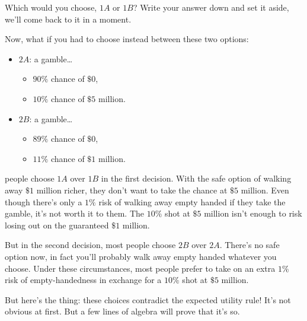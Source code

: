 \documentclass[justified]{tufte-book}
\providecommand{\tightlist}{%
  \setlength{\itemsep}{0pt}\setlength{\parskip}{0pt}}
\theoremstyle{definition}
\theoremstyle{definition}
\theoremstyle{definition}
\theoremstyle{remark}
\begin{document}
Which would you choose, \(1A\) or \(1B\)? Write your answer down and set
it aside, we'll come back to it in a moment.

Now, what if you had to choose instead between these two options:

\begin{itemize}
\tightlist
\item
  \(2A\): a gamble\ldots{}

  \begin{itemize}
  \tightlist
  \item
    \(90\%\) chance of \(\$0\),
  \item
    \(10\%\) chance of \(\$5\) million.
  \end{itemize}
\item
  \(2B\): a gamble\ldots{}

  \begin{itemize}
  \tightlist
  \item
    \(89\%\) chance of \(\$0\),
  \item
    \(11\%\) chance of \(\$1\) million.
  \end{itemize}
\end{itemize}

 people choose \(1A\) over \(1B\) in the first
decision. With the safe option of walking away \(\$1\) million richer,
they don't want to take the chance at \(\$5\) million. Even though
there's only a \(1\%\) risk of walking away empty handed if they take
the gamble, it's not worth it to them. The \(10\%\) shot at \(\$5\)
million isn't enough to risk losing out on the guaranteed \(\$1\)
million.

But in the second decision, most people choose \(2B\) over \(2A\).
There's no safe option now, in fact you'll probably walk away empty
handed whatever you choose. Under these circumstances, most people
prefer to take on an extra \(1\%\) risk of empty-handedness in exchange
for a \(10\%\) shot at \(\$5\) million.

But here's the thing: these choices contradict the expected utility
rule! It's not obvious at first. But a few lines of algebra will prove
that it's so.
\end{document}
